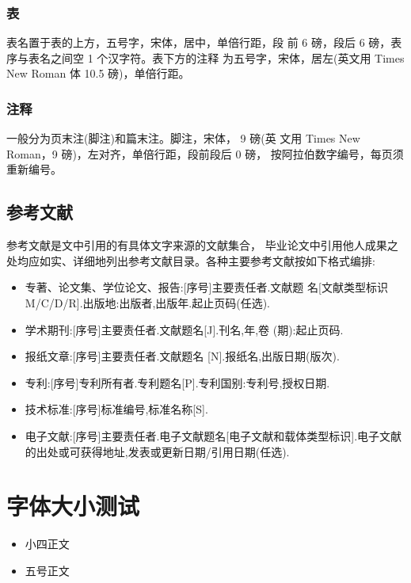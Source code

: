 \documentclass{LZU}
\begin{document}
\subsubsection{表}
表名置于表的上方，五号字，宋体，居中，单倍行距，段 前 6 磅，段后 6 磅，表序与表名之间空 1 个汉字符。表下方的注释 为五号字，宋体，居左(英文用 Times New Roman 体 10.5 磅)，单倍行距。
\subsubsection{注释}
一般分为页末注(脚注)和篇末注。脚注，宋体， 9 磅(英 文用 Times New Roman，9 磅)，左对齐，单倍行距，段前段后 0 磅， 按阿拉伯数字编号，每页须重新编号。
\subsection{参考文献}
\label{subsec:reference}
参考文献是文中引用的有具体文字来源的文献集合， 毕业论文中引用他人成果之处均应如实、详细地列出参考文献目录。各种主要参考文献按如下格式编排:
\begin{itemize}
    \item 专著、论文集、学位论文、报告:[序号]主要责任者.文献题 名[文献类型标识M/C/D/R].出版地:出版者,出版年.起止页码(任选).
    \item 学术期刊:[序号]主要责任者.文献题名[J].刊名,年,卷 (期):起止页码.
    \item 报纸文章:[序号]主要责任者.文献题名 [N].报纸名,出版日期(版次).
    \item 专利:[序号]专利所有者.专利题名[P].专利国别:专利号,授权日期.
    \item 技术标准:[序号]标准编号,标准名称[S].
    \item 电子文献:[序号]主要责任者.电子文献题名[电子文献和载体类型标识].电子文献的出处或可获得地址,发表或更新日期/引用日期(任选).
\end{itemize}
\section{字体大小测试}
\begin{itemize}
    \item {小四}正文
    \item {五号}正文
\end{itemize}

\backmatter
\printbibliography[title={参考文献},heading=bibintoc]
\Appendix
\end{document}
